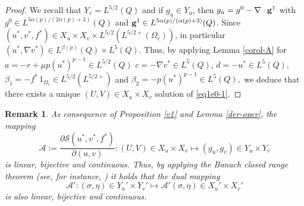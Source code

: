 \documentclass[11pt,reqno]{amsart}%
\newtheorem{remark}{Remark}[section]
\numberwithin{equation}{section}
\begin{document}
{\begin{proof} 
We recall that $Y_v=L^{5/2}(Q)$ and if $g_u\in Y_u$, then $g_u=g^0-\nabla\cdot{\bf g}^1$ with $g^0\in L^{5\alpha(p)/(2\alpha(p)+3)}
(Q)$ and ${\bf g}^1\in L^{5\alpha(p)/(\alpha(p)+3)}(Q)$. 
Since $(u^*,v^*,f^*)\in X_u\times X_v\times L^{5/2}(L^{5/2+}(\Omega_c))$, in particular $(u^*,\nabla v^*)\in L^{\beta(p)}(Q)\times L^5(Q)$. Thus,  by applying Lemma \ref{corol-A} 
for $ a=-r+\mu p(u^*)^{p-1}\in L^{5/2}(Q)$ 
 $c=-\nabla v^*\in L^{5}(Q)$, $d=-u^*\in L^5(Q)$, $\beta_1=-f^*\,1_{\Omega_c}\in L^{5/2}(L^{5/2+})$ and $\beta_2=-p(u^*)^{p-1}\in L^{5}(Q),$ we deduce that there exists a unique $(U,V)\in X_u\times X_v$ solution of \eqref{eq1e0-1}.
\end{proof}
\begin{remark}\label{rem_dual}
As consequence of Proposition \ref{v1} and Lemma \ref{der-oper}, the mapping 
$${\mathcal A}:=\frac{\partial\mathcal{S}(u^*,v^*,f^*)}{\partial(u,v)}: (U,V) \in   {X}_{u}\times {X}_{v} \longmapsto (g_u,g_v)\in Y_u\times Y_v$$
 is linear, bijective  and continuous. Thus, by applying the Banach closed range theorem (see, for instance, \cite[Theorem 3.E]{Zeidler}) it holds that the dual mapping 
 $${\mathcal A}': (\sigma,\eta)\in Y_u'\times Y_v'   \longmapsto     {\mathcal A}'(\sigma,\eta)\in {X}_{u} '\times {X}_{v}' $$ is also linear, bijective and continuous.
\end{remark}
%
%
%
%
% 
% 
% 
% 
% 
}
\end{document}
